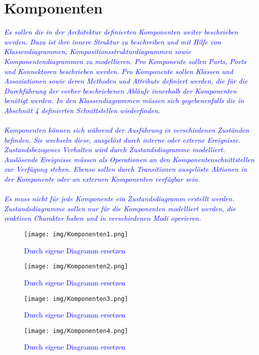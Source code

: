 \section{Komponenten}
\textcolor{blue}{\textit{Es sollen die in der Architektur definierten Komponenten weiter beschrieben werden. Dazu ist ihre innere Struktur zu beschreiben und mit Hilfe von Klassendiagrammen, Kompositionsstrukturdiagrammen sowie Komponentendiagrammen zu modellieren. Pro Komponente sollen Parts, Ports und Konnektoren beschrieben werden. Pro Komponente sollen Klassen und Assoziationen sowie deren Methoden und Attribute definiert werden, die für die Durchführung der vorher beschriebenen Abläufe innerhalb der Komponenten benötigt werden. In den Klassendiagrammen müssen sich gegebenenfalls die in Abschnitt 4 definierten Schnittstellen wiederfinden.\\\\
Komponenten können sich während der Ausführung in verschiedenen Zuständen befinden. Sie wechseln diese, ausgelöst durch interne oder externe Ereignisse. Zustandsbezogenes Verhalten wird durch Zustandsdiagramme modelliert. Auslösende Ereignisse müssen als Operationen an den Komponentenschnittstellen zur Verfügung stehen. Ebenso sollen durch Transitionen ausgelöste Aktionen in der Komponente oder an externen Komponenten verfügbar sein.\\\\
Es muss nicht für jede Komponente ein Zustandsdiagramm erstellt werden. Zustandsdiagramme sollen nur für die Komponenten modelliert werden, die reaktiven Charakter haben und in verschiedenen Modi operieren.\\
}}

\begin{figure}[H]
\centering
\texttt{[image: img/Komponenten1.png]}
\caption{\textcolor{blue}{Durch eigene Diagramm ersetzen}}
\label{KomponentenStruktur1}
\end{figure}

\begin{figure}[H]
\centering
\texttt{[image: img/Komponenten2.png]}
\caption{\textcolor{blue}{Durch eigene Diagramm ersetzen}}
\label{KomponentenStruktur2}
\end{figure}

\begin{figure}[H]
\centering
\texttt{[image: img/Komponenten3.png]}
\caption{\textcolor{blue}{Durch eigene Diagramm ersetzen}}
\label{KomponentenStruktur3}
\end{figure}

\begin{figure}[H]
\centering

\texttt{[image: img/Komponenten4.png]}
\caption{\textcolor{blue}{Durch eigene Diagramm ersetzen}}
\label{KomponentenStruktur4}
\end{figure}